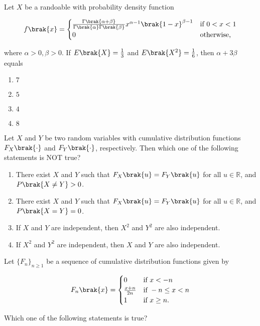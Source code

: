 \item Let $X$ be a randoable with probability density function

\[
f\brak{x} = \begin{cases}
\frac{\Gamma\brak{\alpha+\beta}}{\Gamma\brak{\alpha}\Gamma\brak{\beta}}x^{\alpha-1}\brak{1-x}^{\beta-1} & \text{if } 0 < x < 1 \\
0 & \text{otherwise,}
\end{cases} 
\]

where $\alpha > 0, \beta > 0$. If $E\brak{X} = \frac{1}{3}$ and $E\brak{X^2} = \frac{1}{6}$, then $\alpha + 3\beta$ equals

\begin{enumerate}
    \item $7$
    \item $5$
    \item $4$
    \item $8$
\end{enumerate}

\item Let $X$ and $Y$ be two random variables with cumulative distribution functions $F_X\brak{\cdot}$ and $F_Y\brak{\cdot}$, respectively. Then which one of the following statements is NOT true?

\begin{enumerate}
    \item There exist $X$ and $Y$ such that $F_X\brak{u} = F_Y\brak{u}$ for all $u \in \mathbb{R}$, and $P\brak{X \neq Y} > 0$.
    \item There exist $X$ and $Y$ such that $F_X\brak{u} = F_Y\brak{u}$ for all $u \in \mathbb{R}$, and $P\brak{X = Y} = 0$.
    \item If $X$ and $Y$ are independent, then $X^2$ and $Y^2$ are also independent.
    \item If $X^2$ and $Y^2$ are independent, then $X$ and $Y$ are also independent.
\end{enumerate}

\item Let $\{F_n\}_{n\geq1}$ be a sequence of cumulative distribution functions given by 

\[
F_n\brak{x} = \begin{cases}
0 & \text{if } x < -n \\
\frac{x+n}{2n} & \text{if } -n \leq x < n \\
1 & \text{if } x \geq n.
\end{cases}
\]

Which one of the following statements is true?

